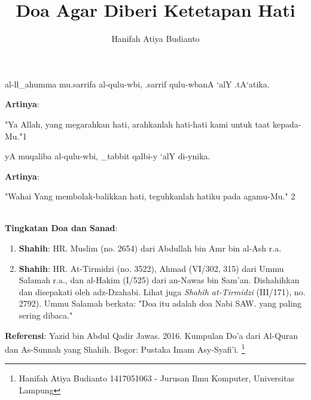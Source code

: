 \documentclass[a4paper,12pt]{article}
\title{\Large Doa Agar Diberi Ketetapan Hati}
\author{\calligra Hanifah Atiya Budianto}
\begin{document}
\sffamily
\maketitle 
\fullvocalize
{}
\begin{arabtext}
\noindent
al-ll_ahumma mu.sarrifa al-qulu-wbi, .sarrif qulu-wbanA `alY .tA`atika.\\
\end{arabtext}
\noindent
\textbf{Artinya}:
\par
\indent
"Ya Allah, yang megarahkan hati, arahkanlah hati-hati kami untuk taat 
kepada-Mu."{\scriptsize 1}\\
\begin{arabtext}
\noindent
yA muqaliba al-qulu-wbi, _tabbit qalbi-y `alY di-ynika.\\
\end{arabtext}
\noindent
\textbf{Artinya}:
\par
\indent
"Wahai Yang membolak-balikkan hati, teguhkanlah hatiku pada agamu-Mu."
{\scriptsize 2}\\\\
\par
\noindent
\textbf{Tingkatan Doa dan Sanad}:
\begin{enumerate}
\item \textbf{Shahih}: HR. Muslim (no. 2654) dari Abdullah bin Amr bin 
al-Ash r.a.
\item \textbf{Shahih}: HR. At-Tirmidzi (no. 3522), Ahmad (VI/302, 315) dari 
Ummu Salamah r.a., dan al-Hakim (I/525) dari an-Nawas bin Sam'an. 
Dishahihkan dan disepakati oleh adz-Dzahabi. Lihat juga \textit{Shah\^{i}h 
at-Tirmidzi} (III/171), no. 2792). Ummu Salamah berkata: "Doa itu adalah 
doa Nabi SAW. yang paling sering dibaca."
\end{enumerate}
\textbf{Referensi}: Yazid bin Abdul Qadir Jawas. 2016. Kumpulan Do'a dari
Al-Quran dan As-Sunnah yang Shahih. Bogor: Pustaka Imam Asy-Syafi'i.
\footnote{Hanifah Atiya Budianto 1417051063 - Jurusan Ilmu Komputer,
Universitas Lampung}
\end{document}
